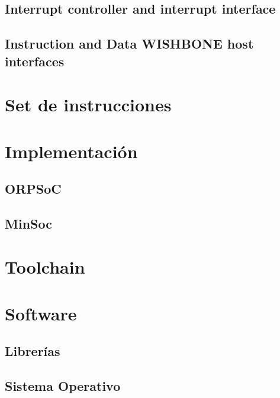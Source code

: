 	
	\subsection{Interrupt controller and interrupt interface}
	
	
	\subsection{Instruction and Data WISHBONE host interfaces}
	
	
	
	\section{Set de instrucciones}
	
	
	
	\section{Implementación}
		\subsection{ORPSoC}
		\subsection{MinSoc}
	\section{Toolchain}
	\section{Software}
		\subsection{Librerías}
		\subsection{Sistema Operativo}